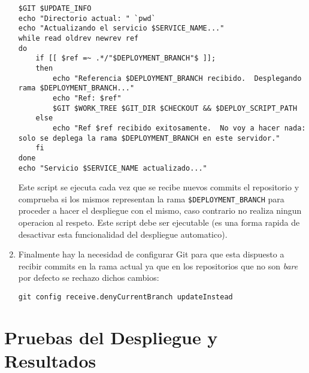 \begin{enumerate}
\begin{lstlisting}[breaklines=true]
$GIT $UPDATE_INFO
echo "Directorio actual: " `pwd`
echo "Actualizando el servicio $SERVICE_NAME..."
while read oldrev newrev ref
do
    if [[ $ref =~ .*/"$DEPLOYMENT_BRANCH"$ ]];
    then
        echo "Referencia $DEPLOYMENT_BRANCH recibido.  Desplegando rama $DEPLOYMENT_BRANCH..."
        echo "Ref: $ref"
        $GIT $WORK_TREE $GIT_DIR $CHECKOUT && $DEPLOY_SCRIPT_PATH
    else
        echo "Ref $ref recibido exitosamente.  No voy a hacer nada: solo se deplega la rama $DEPLOYMENT_BRANCH en este servidor."
    fi
done
echo "Servicio $SERVICE_NAME actualizado..."

    \end{lstlisting}
    Este script se ejecuta cada vez que se recibe nuevos commits el repositorio y comprueba si los mismos representan la rama \texttt{\$DEPLOYMENT\_BRANCH} para proceder a hacer el despliegue con el mismo, caso contrario no realiza ningun operacion al respeto. Este script debe ser ejecutable (es una forma rapida de desactivar esta funcionalidad del despliegue automatico).
    \item Finalmente hay la necesidad de configurar Git para que esta dispuesto a recibir commits en la rama actual ya que en los repositorios que no son \textit{bare} por defecto se rechazo dichos cambios:
    \begin{lstlisting}
git config receive.denyCurrentBranch updateInstead
    \end{lstlisting}
\end{enumerate}

\section{Pruebas del Despliegue y Resultados}
